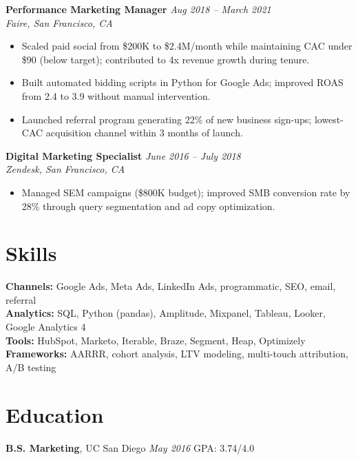 \documentclass[11pt,a4paper]{article}
\begin{document}
\vspace{4pt}
\noindent\textbf{Performance Marketing Manager} \hfill \textit{Aug 2018 -- March 2021}\\
\textit{Faire, San Francisco, CA}
\begin{itemize}
  \item Scaled paid social from \$200K to \$2.4M/month while maintaining CAC under \$90 (below target); contributed to 4x revenue growth during tenure.
  \item Built automated bidding scripts in Python for Google Ads; improved ROAS from 2.4 to 3.9 without manual intervention.
  \item Launched referral program generating 22\% of new business sign-ups; lowest-CAC acquisition channel within 3 months of launch.
\end{itemize}

\vspace{4pt}
\noindent\textbf{Digital Marketing Specialist} \hfill \textit{June 2016 -- July 2018}\\
\textit{Zendesk, San Francisco, CA}
\begin{itemize}
  \item Managed SEM campaigns (\$800K budget); improved SMB conversion rate by 28\% through query segmentation and ad copy optimization.
\end{itemize}

\section{Skills}
\textbf{Channels:} Google Ads, Meta Ads, LinkedIn Ads, programmatic, SEO, email, referral\\
\textbf{Analytics:} SQL, Python (pandas), Amplitude, Mixpanel, Tableau, Looker, Google Analytics 4\\
\textbf{Tools:} HubSpot, Marketo, Iterable, Braze, Segment, Heap, Optimizely\\
\textbf{Frameworks:} AARRR, cohort analysis, LTV modeling, multi-touch attribution, A/B testing

\section{Education}
\textbf{B.S. Marketing}, UC San Diego \hfill \textit{May 2016} \quad GPA: 3.74/4.0
\end{document}
